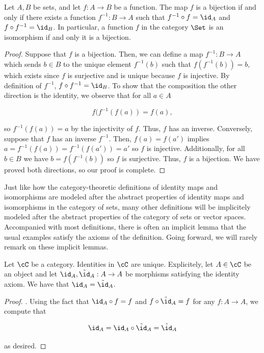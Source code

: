 \begin{lem} Let $A,B$ be sets, and let $f:A\to B$ be a function. The map $f$ is a bijection if and only if there exists a function $f^{-1}: B\to A$ such that $f^{-1}\circ f= \id_A$ and $f\circ f^{-1}=\id_B$. In particular, a function $f$ in the category $\Set$ is an isomorphism if and only it is a bijection.
\end{lem}
\begin{proof} Suppose that $f$ is a bijection. Then, we can define a map $f^{-1}:B\to A$ which sends $b\in B$ to the unique element $f^{-1}(b)$ such that $f(f^{-1}(b))=b$, which exists since $f$ is surjective and is unique because $f$ is injective. By definition of $f^{-1}$, $f\circ f^{-1}=\id_{B}$. To show that the composition the other direction is the identity, we observe that for all $a\in A$

$$f(f^{-1}(f(a))=f(a),$$

so $f^{-1}(f(a))=a$ by the injectivity of $f$. Thus, $f$ has an inverse. Conversely, suppose that $f$ has an inverse $f^{-1}$. Then, $f(a)=f(a')$ implies $a=f^{-1}(f(a))=f^{-1}(f(a'))=a'$ so $f$ is injective. Additionally, for all $b\in B$ we have $b=f(f^{-1}(b))$ so $f$ is surjective. Thus, $f$ is a bijection. We have proved both directions, so our proof is complete.
\end{proof}

\begin{rem} Just like how the category-theoretic definitions of identity maps and isomorphisms are modeled after the abstract properties of identity maps and isomorphisms in the category of sets, many other definitions will be implicitely modeled after the abstract properties of the category of sets or vector spaces. Accompanied with most definitions, there is often an implicit lemma that the usual examples satisfy the axioms of the definition. Going forward, we will rarely remark on these implicit lemmas.
\end{rem}

\begin{prop}\label{identity-unique} Let $\cC$ be a category. Identities in $\cC$ are unique. Explicitely, let $A\in \cC$ be an object and let $\id_A,\tilde{\id}_A:A\to A$ be morphisms satisfying the identity axiom. We have that $\id_A=\tilde{\id}_A$.
\end{prop}
\begin{proof}. Using the fact that $\id_A \circ f = f$ and $f\circ \tilde{\id}_A=f$ for any $f:A\to A$, we compute that

$$\id_A= \id_A \circ \tilde{\id}_A = \tilde{\id}_A$$

as desired.
\end{proof}

